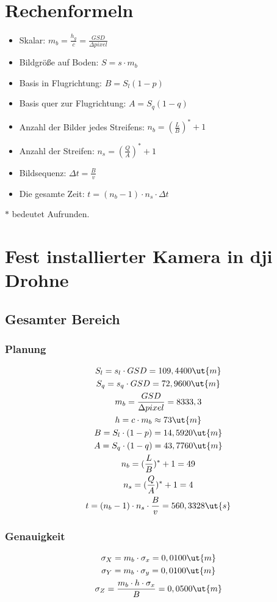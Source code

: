 \section{Rechenformeln}
\begin{itemize}
	\item Skalar: $m_b = \frac{h_g}{c} = \frac{GSD}{\Delta pixel}$
	\item Bildgröße auf Boden: $S = s \cdot m_b$ 
	\item Basis in Flugrichtung: $B = S_l(1-p)$
	\item Basis quer zur Flugrichtung: $A = S_q(1-q)$
	\item Anzahl der Bilder jedes Streifens: $n_b = (\frac{L}{B})^* + 1$
	\item Anzahl der Streifen: $n_s = (\frac{Q}{A})^* + 1$
	\item Bildsequenz: $\Delta t = \frac{B}{v}$ 
	\item Die gesamte Zeit: $t = (n_b - 1) \cdot n_s \cdot \Delta t$
\end{itemize}
$*$ bedeutet Aufrunden.

\section{Fest installierter Kamera in dji Drohne}
\subsection{Gesamter Bereich}
\subsubsection{Planung}
\begin{gather*}
	S_l = s_l \cdot GSD = 109,4400 \ut{m} \\
	S_q = s_q \cdot GSD = 72,9600 \ut{m} \\
	m_b = \frac{GSD}{\Delta pixel} = 8333,3 \\
	h = c \cdot m_b \approx 73 \ut{m}  \\
	B = S_l \cdot (1-p) = 14,5920 \ut{m} \\
	A = S_q \cdot (1-q) = 43,7760 \ut{m} \\
	n_b = (\frac{L}{B})^* + 1 = 49 \\
	n_s = (\frac{Q}{A})^* + 1 = 4 \\	
	t = (n_b - 1) \cdot n_s \cdot \frac{B}{v} = 560,3328 \ut{s} \\
\end{gather*}
\subsubsection{Genauigkeit}
\begin{gather*}
	\sigma_X = m_b \cdot \sigma_x = 0,0100 \ut{m} \\
	\sigma_Y = m_b \cdot \sigma_y = 0,0100 \ut{m} \\
	\sigma_Z = \frac{m_b \cdot h \cdot \sigma_x}{B} = 0,0500 \ut{m}
\end{gather*}

